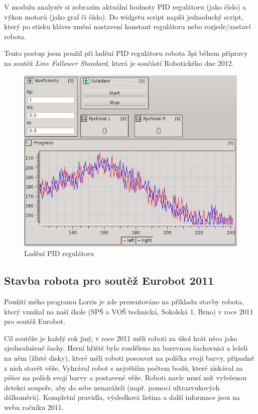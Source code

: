 \documentclass[12pt, a4paper, oneside]{article}
\newcommand{\It}{\textit}  %
\begin{document}
V modulu analyzér si zobrazím aktuální hodnoty PID regulátoru (jako číslo) a výkon motorů (jako graf či číslo). Do widgetu script napíši jednoduchý script, který po stisku kláves změní nastavení konstant regulátoru nebo rozjede/zastaví robota.

Tento postup jsem použil při ladění PID regulátoru robota 3pi\cite{3pi} během přípravy na soutěž \It{Line Follower Standard}, která je součástí Robotického dne 2012\cite{rob_den}.
\begin{figure}[H]
\begin{center}
\includegraphics[scale=0.55]{img/use_pid.png}
\caption{Ladění PID regulátoru}
\end{center}
\end{figure}

\newpage
\subsection{Stavba robota pro soutěž Eurobot 2011}
Použití mého programu Lorris je zde prezentováno na příkladu stavby robota, který vznikal na naší škole (SPŠ a VOŠ technická, Sokolská 1, Brno) v roce 2011 pro soutěž Eurobot\cite{eurobot}.

Cíl soutěže je každý rok jiný, v roce 2011 měli roboti za úkol hrát něco jako zjednodušené šachy. Herní hřiště bylo rozděleno na barevnou šachovnici a leželi na něm  (žluté disky), které měli roboti posouvat na políčka svojí barvy, případně z nich stavět věže. Vyhrával robot s největším počtem bodů, které získával za pěšce na polích svojí barvy a postavené věže. Roboti navíc musí mít vyřešenou detekci soupeře, aby do sebe nenaráželi (např. pomocí ultrazvukových dálkoměrů). Kompletní pravidla, výsledková listina a další informace jsou na webu ročníku 2011\cite{eurobot11}.
\end{document}
